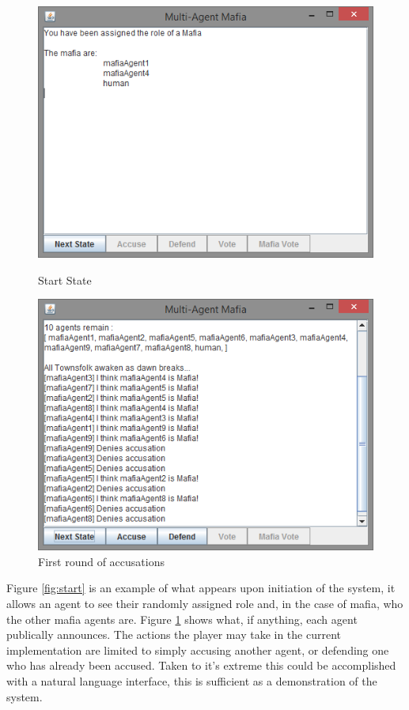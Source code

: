 \documentclass[12pt]{article} %
\begin{document}
\begin{figure}[H]
\centering
\begin{minipage}{0.49\textwidth}
\centering
\includegraphics[width=\linewidth]{mafia-start}
\caption{Start State}
\label{fig:start}
\end{minipage}\hfill
\begin{minipage}{0.49\textwidth}
\centering
\includegraphics[width=\linewidth]{mafia-discussion}
\caption{First round of accusations}
\label{fig:discussion}
\end{minipage}
\end{figure}

Figure \ref{fig:start} is an example of what appears upon initiation of the system, it allows an agent to see their randomly assigned role and, in the case of mafia, who the other mafia agents are. Figure \ref{fig:discussion} shows what, if anything, each agent publically announces. The actions the player may take in the current implementation are limited to simply accusing another agent, or defending one who has already been accused. Taken to it's extreme this could be accomplished with a natural language interface, this is sufficient as a demonstration of the system.
\end{document}
